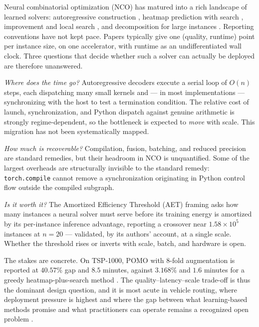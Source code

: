 \documentclass[11pt,a4paper,twocolumn]{article}
\begin{document}
Neural combinatorial optimization (NCO) has matured into a rich landscape of
learned solvers: autoregressive construction \citep{kool2019attention,kwon2020pomo},
heatmap prediction with search \citep{joshi2019gnn,sun2023difusco}, improvement and
local search \citep{ma2021dact,hottung2022eas}, and decomposition for large
instances \citep{duan2023htsp,ye2024glop}. Reporting conventions have not kept
pace. Papers typically give one (quality, runtime) point per instance size, on one
accelerator, with runtime as an undifferentiated wall clock. Three questions that
decide whether such a solver can actually be deployed are therefore unanswered.

\emph{Where does the time go?} Autoregressive decoders execute a serial loop of
$O(n)$ steps, each dispatching many small kernels and --- in most implementations
--- synchronizing with the host to test a termination condition. The relative cost
of launch, synchronization, and Python dispatch against genuine arithmetic is
strongly regime-dependent, so the bottleneck is expected to \emph{move} with scale.
This migration has not been systematically mapped.

\emph{How much is recoverable?} Compilation, fusion, batching, and reduced
precision are standard remedies, but their headroom in NCO is unquantified. Some of
the largest overheads are structurally invisible to the standard remedy:
\texttt{torch.compile} cannot remove a synchronization originating in Python
control flow outside the compiled subgraph.

\emph{Is it worth it?} The Amortized Efficiency Threshold (AET) framing
\citep{aet2026} asks how many instances a neural solver must serve before its
training energy is amortized by its per-instance inference advantage, reporting a
crossover near $1.58\times10^{5}$ instances at $n{=}20$ --- validated, by its
authors' account, at a single scale. Whether the threshold rises or inverts with
scale, batch, and hardware is open.

The stakes are concrete. On TSP-1000, POMO with 8-fold augmentation is reported at
$40.57\%$ gap and $8.5$ minutes, against $3.168\%$ and $1.6$ minutes for a greedy
heatmap-plus-search method \citep{luo2024icam}. The quality--latency--scale
trade-off is thus the dominant design question, and it is most acute in vehicle
routing, where deployment pressure is highest and where the gap between what
learning-based methods promise and what practitioners can operate remains a
recognized open problem \citep{bai2023analytics}.
\end{document}
